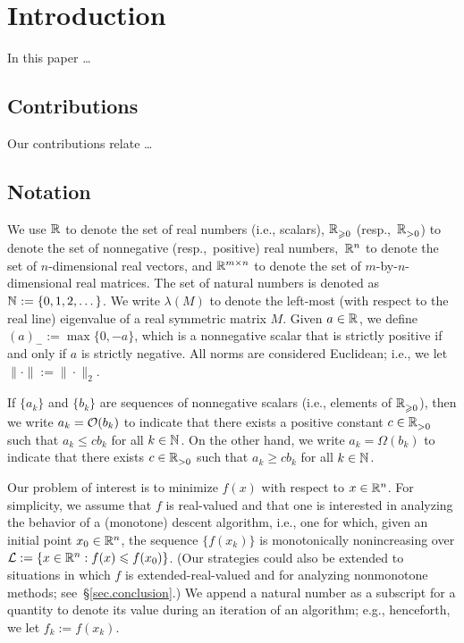 

\section{Introduction}\label{sec.introduction}

In this paper \dots

\subsection{Contributions}

Our contributions relate \dots

\subsection{Notation}

We use $\mathbb{R}^{}$ to denote the set of real numbers (i.e., scalars), $\mathbb{R}^{}_{\geqslant0}$ (resp.,~$\mathbb{R}^{}_{>0}$) to denote the set of nonnegative (resp.,~positive) real numbers,~$\mathbb{R}^{n}$ to denote the set of $n$-dimensional real vectors, and $\mathbb{R}^{m \times n}$ to denote the set of $m$-by-$n$-dimensional real matrices.  The set of natural numbers is denoted as $\mathbb{N}^{} := \{0,1,2,\dots\}$.  We write $\lambda(M)$ to denote the left-most (with respect to the real line) eigenvalue of a real symmetric matrix $M$.  Given $a \in \mathbb{R}^{}$, we define $(a)_- := \max\{0,-a\}$, which is a nonnegative scalar that is strictly positive if and only if $a$ is strictly negative.  All norms are considered Euclidean; i.e., we let $\|\cdot\| := \|\cdot\|_2$.

If $\{a_k\}$ and $\{b_k\}$ are sequences of nonnegative scalars (i.e., elements of $\mathbb{R}^{}_{\geqslant0}$), then we write $a_k = \Ocal(b_k)$ to indicate that there exists a positive constant $c \in \mathbb{R}^{}_{>0}$ such that $a_k \leq cb_k$ for all $k \in \mathbb{N}^{}$.  On the other hand, we write $a_k = \Omega(b_k)$ to indicate that there exists $c \in \mathbb{R}^{}_{>0}$ such that $a_k \geq cb_k$ for all $k \in \mathbb{N}^{}$.

Our problem of interest is to minimize $f(x)$ with respect to $x \in \mathbb{R}^{n}$.  For simplicity, we assume that $f$ is real-valued and that one is interested in analyzing the behavior of a (monotone) descent algorithm, i.e., one for which, given an initial point $x_0 \in \mathbb{R}^{n}$, the sequence $\{f(x_k)\}$ is monotonically nonincreasing over $\Lcal := \{x \in \R{n} : f(x) \leq f(x_0)\}$.  (Our strategies could also be extended to situations in which $f$ is extended-real-valued and for analyzing nonmonotone methods; see~\S\ref{sec.conclusion}.)  We append a natural number as a subscript for a quantity to denote its value during an iteration of an algorithm; e.g., henceforth, we let $f_k := f(x_k)$.

